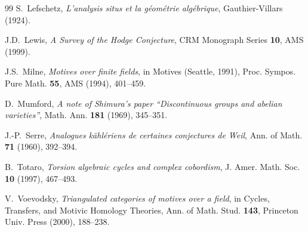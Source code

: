 \documentclass[11pt]{article}
\theoremstyle{definition}
\begin{document}
\begin{thebibliography}{99}
S.~Lefschetz,
\textit{L'analysis situs et la g\'eom\'etrie alg\'ebrique},
Gauthier-Villars (1924).

J.D.~Lewis,
\textit{A Survey of the Hodge Conjecture},
CRM Monograph Series \textbf{10}, AMS (1999).

J.S.~Milne,
\textit{Motives over finite fields},
in Motives (Seattle, 1991), Proc. Sympos. Pure Math. \textbf{55},
AMS (1994), 401--459.

D.~Mumford,
\textit{A note of Shimura's paper ``Discontinuous groups and abelian
varieties''},
Math. Ann. \textbf{181} (1969), 345--351.

J.-P.~Serre,
\textit{Analogues k\"ahl\'eriens de certaines conjectures de Weil},
Ann. of Math. \textbf{71} (1960), 392--394.

B.~Totaro,
\textit{Torsion algebraic cycles and complex cobordism},
J. Amer. Math. Soc. \textbf{10} (1997), 467--493.

V.~Voevodsky,
\textit{Triangulated categories of motives over a field},
in Cycles, Transfers, and Motivic Homology Theories,
Ann. of Math. Stud. \textbf{143}, Princeton Univ. Press (2000), 188--238.

\end{thebibliography}
\end{document}
